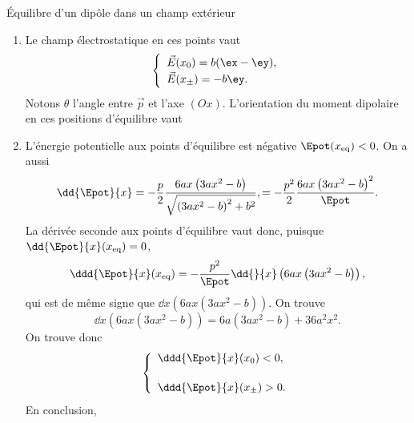 \begin{exo}[PC][3][TD]{Équilibre d'un dipôle dans un champ extérieur}
{\begin{enumerate}
{        \right.
      }
    Notons $x_0$ et $x_{\pm}$ ces positions.
    \item Le champ électrostatique en ces points vaut
    $$
    \left\{
      \begin{array}{l}
        \Vec{E}(x_0) = b(\ex-\ey),\\[0.5mm]
        \Vec{E}(x_{\pm}) = - b\ey.
      \end{array}
      \right.
    $$
    Notons $\theta$ l'angle entre $\Vec{p}$ et l'axe $(Ox)$.
    L'orientation du moment dipolaire en ces positions d'équilibre vaut 
    \item L'énergie potentielle aux points d'équilibre est négative $\Epot(x_{\rm eq}) <0 $. On a aussi
    $$ 
    \dd{\Epot}{x} = -\frac{p}{2}\frac{6ax\left(3ax^2 - b\right)}{\sqrt{\left(3ax^2 - b\right)^2 + b^2}}, = -\frac{p^2}{2}\frac{6ax\left(3ax^2 - b\right)^2}{\Epot}.
    $$ 
    La dérivée seconde aux points d'équilibre vaut donc, puisque $\dd{\Epot}{x}(x_{\rm eq}) = 0$,
    $$
    \ddd{\Epot}{x}(x_{\rm eq}) = -\frac{p^2}{\Epot} \dd{}{x} \left( 6ax\left(3ax^2 - b\right) \right),
    $$
    qui est de même signe que $\dd{}{x}\left( 6ax\left(3ax^2 - b\right) \right)$. On trouve 
    $$
    \dd{}{x}\left( 6ax\left(3ax^2 - b\right) \right) = 6a(3ax^2 - b) + 36 a^2x^2.
    $$
    On trouve donc 
    $$
      \left\{
        \begin{array}{l}
          \ddd{\Epot}{x}(x_0) < 0,\\[5mm]
          \ddd{\Epot}{x}(x_{\pm}) > 0.
        \end{array}
        \right.
    $$
    En conclusion,

\end{enumerate}}
\end{exo}
